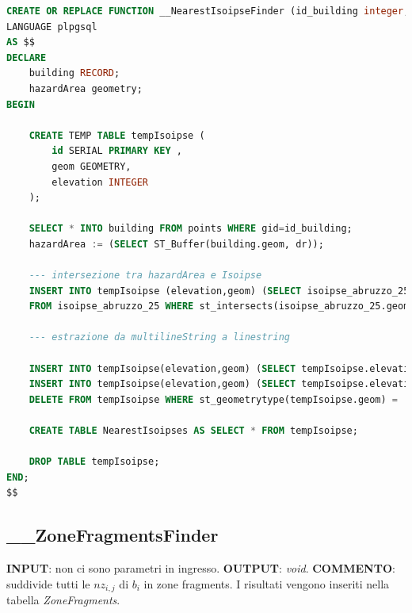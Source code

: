 \begin{lstlisting}[language=SQL]
CREATE OR REPLACE FUNCTION __NearestIsoipseFinder (id_building integer, dr integer) RETURNS void
LANGUAGE plpgsql
AS $$
DECLARE
	building RECORD;
	hazardArea geometry;
BEGIN
	
	CREATE TEMP TABLE tempIsoipse (
		id SERIAL PRIMARY KEY ,
		geom GEOMETRY,
		elevation INTEGER
	);
	
	SELECT * INTO building FROM points WHERE gid=id_building;
	hazardArea := (SELECT ST_Buffer(building.geom, dr));
	
	--- intersezione tra hazardArea e Isoipse
	INSERT INTO tempIsoipse (elevation,geom) (SELECT isoipse_abruzzo_25.elevation,st_intersection(isoipse_abruzzo_25.geom,hazardArea) as geom
	FROM isoipse_abruzzo_25 WHERE st_intersects(isoipse_abruzzo_25.geom,hazardArea));
	
	--- estrazione da multilineString a linestring
	
	INSERT INTO tempIsoipse(elevation,geom) (SELECT tempIsoipse.elevation,(st_dump(tempIsoipse.geom)).geom FROM tempIsoipse WHERE st_geometrytype(tempIsoipse.geom) = 'ST_MultiLineString') ;
	INSERT INTO tempIsoipse(elevation,geom) (SELECT tempIsoipse.elevation, st_linemerge(tempIsoipse.geom) FROM tempIsoipse WHERE st_geometrytype(tempIsoipse.geom) = 'ST_MultiLineString');
	DELETE FROM tempIsoipse WHERE st_geometrytype(tempIsoipse.geom) = 'ST_MultiLineString';
	
	CREATE TABLE NearestIsoipses AS SELECT * FROM tempIsoipse;
	
	DROP TABLE tempIsoipse;
END;
$$
\end{lstlisting}

\subsection{\_\_ZoneFragmentsFinder}
\textbf{INPUT}: non ci sono parametri in ingresso. \newline
\textbf{OUTPUT}: \textit{void}. \newline
\textbf{COMMENTO}: suddivide tutti le $nz_{i,j}$ di $b_i$ in zone fragments. I risultati vengono inseriti nella tabella \textit{ZoneFragments}.

